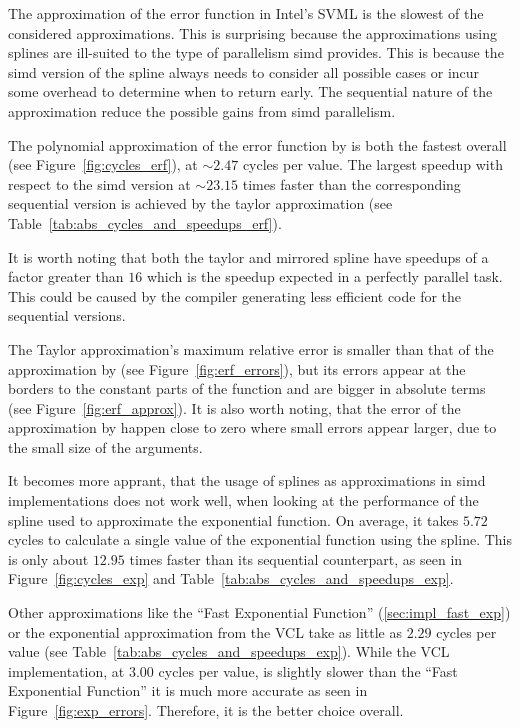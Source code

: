 \documentclass[a4paper, 11pt]{memoir}
\begin{document}
    The approximation of the error function in Intel's SVML is the slowest of the considered approximations. This is
    surprising because the approximations using splines are ill-suited to the type of parallelism \gls{simd} provides.
    This is because the \gls{simd} version of the spline always needs to consider all possible cases or incur some overhead
    to determine when to return early. The sequential nature of the approximation reduce the possible gains from \gls{simd}
    parallelism.

    The polynomial approximation of the error function by \citeauthor{AbraSteg72} is both the fastest overall (see
    Figure~\ref{fig:cycles_erf}), at $\sim2.47$ cycles per value. The largest speedup with respect to the
    \gls{simd} version at $\sim23.15$ times faster than the corresponding sequential version is achieved by the taylor
    approximation (see Table~\ref{tab:abs_cycles_and_speedups_erf}).

    It is worth noting that both the taylor and mirrored spline have speedups of a factor greater than $16$ which is the
    speedup expected in a perfectly parallel task. This could be caused by the compiler generating less efficient code
    for the sequential versions.

    The Taylor approximation's maximum relative error is smaller than that of the approximation by \citeauthor{AbraSteg72}
    (see Figure~\ref{fig:erf_errors}), but its errors appear at the borders to the constant parts of the function and
    are bigger in absolute terms (see Figure~\ref{fig:erf_approx}). It is also worth noting, that the error of the
    approximation by \citeauthor{AbraSteg72} happen close to zero where small errors appear larger, due to the small
    size of the arguments.

    It becomes more apprant, that the usage of splines as approximations in \gls{simd} implementations does not work well,
    when looking at the performance of the spline used to approximate the exponential function. On average, it takes $5.72$
    cycles to calculate a single value of the exponential function using the spline. This is only about $12.95$ times faster
    than its sequential counterpart, as seen in Figure~\ref{fig:cycles_exp} and Table~\ref{tab:abs_cycles_and_speedups_exp}.

    Other approximations like the \enquote{Fast Exponential Function} (\ref{sec:impl_fast_exp}) or the exponential
    approximation from the VCL take as little as $2.29$ cycles per value (see Table~\ref{tab:abs_cycles_and_speedups_exp}).
    While the VCL implementation, at $3.00$ cycles per value, is slightly slower than the \enquote{Fast Exponential Function}
    it is much more accurate as seen in Figure~\ref{fig:exp_errors}. Therefore, it is the better choice overall.
\end{document}
